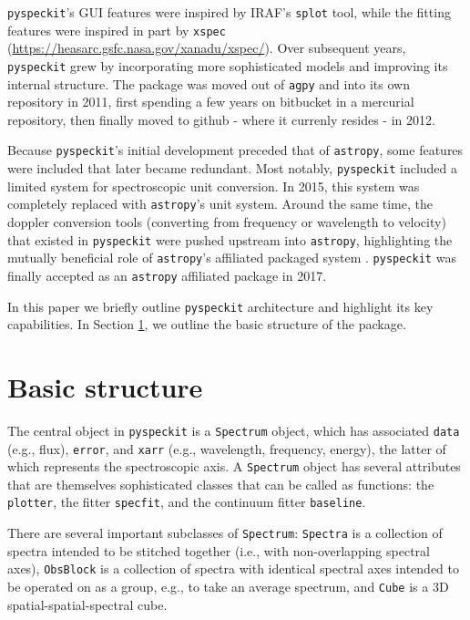 \documentclass[twocolumn]{aastex62}
\newcommand{\pyspeckit}{\texttt{pyspeckit}\xspace}
\newcommand{\astropy}{\texttt{astropy}\xspace}
\begin{document}
\pyspeckit's GUI features were inspired by IRAF's \texttt{splot} tool, while
the fitting features were inspired in part by \texttt{xspec}
(\url{https://heasarc.gsfc.nasa.gov/xanadu/xspec/}).  Over subsequent years,
\pyspeckit grew by incorporating more sophisticated models and improving its
internal structure.  The package was moved out of \texttt{agpy} and into its
own repository in 2011, first spending a few years on bitbucket in a mercurial
repository, then finally moved to github - where it currenly resides - in 2012.

Because \pyspeckit's initial development preceded that of \astropy, some features
were included that later became redundant.  Most notably, \pyspeckit included
a limited system for spectroscopic unit conversion.  In 2015, this system
was completely replaced with \astropy's unit system.  Around the same time,
the doppler conversion tools (converting from frequency or wavelength to 
velocity) that existed in \pyspeckit were pushed upstream into \astropy,
highlighting the mutually beneficial role of \astropy's affiliated
packaged system \citep{AstropyCollaboration2018}.  \pyspeckit was finally
accepted as an \astropy affiliated package in 2017.


In this paper we briefly outline \texttt{pyspeckit} architecture and highlight
its key capabilities. In Section \ref{sec:basicstructure}, we  outline the
basic structure of the package.



\section{Basic structure}
\label{sec:basicstructure}
The central object in \pyspeckit is a \texttt{Spectrum} object, which has
associated \texttt{data} (e.g., flux), \texttt{error}, and \texttt{xarr} (e.g., wavelength,
frequency, energy), the latter of
which represents the spectroscopic axis.  A \texttt{Spectrum} object has
several attributes that are themselves sophisticated classes that can be called
as functions: the \texttt{plotter}, the fitter \texttt{specfit}, and the
continuum fitter \texttt{baseline}.

There are several important subclasses of \texttt{Spectrum}: \texttt{Spectra}
is a collection of spectra intended to be stitched together (i.e., with
non-overlapping spectral axes), \texttt{ObsBlock} is a collection of spectra
with identical spectral axes intended to be operated on as a group, e.g., to
take an average spectrum, and \texttt{Cube} is a 3D spatial-spatial-spectral
cube.
\end{document}
